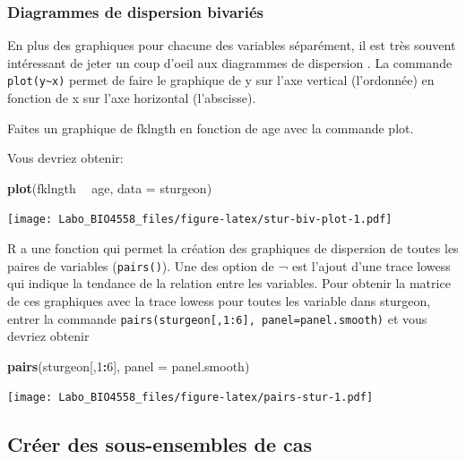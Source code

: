\documentclass[12pt,]{book}
\makeatletter
\newenvironment{Shaded}{\begin{snugshade}}{\end{snugshade}}
\newcommand{\DataTypeTok}[1]{\textcolor[rgb]{0.13,0.29,0.53}{#1}}
\newcommand{\DecValTok}[1]{\textcolor[rgb]{0.00,0.00,0.81}{#1}}
\newcommand{\KeywordTok}[1]{\textcolor[rgb]{0.13,0.29,0.53}{\textbf{#1}}}
\newcommand{\NormalTok}[1]{#1}
\newcommand{\OperatorTok}[1]{\textcolor[rgb]{0.81,0.36,0.00}{\textbf{#1}}}
\newcommand{\StringTok}[1]{\textcolor[rgb]{0.31,0.60,0.02}{#1}}
\newenvironment{kframe}{%
\medskip{}
\setlength{\fboxsep}{.8em}
\def\at@end@of@kframe{}%
\ifinner\ifhmode%
 \def\at@end@of@kframe{\end{minipage}}%
 \begin{minipage}{\columnwidth}%
\fi\fi%
\def\FrameCommand##1{\hskip\@totalleftmargin \hskip-\fboxsep
\colorbox{incolor}{##1}\hskip-\fboxsep
    \hskip-\linewidth \hskip-\@totalleftmargin \hskip\columnwidth}%
\MakeFramed {\advance\hsize-\width
  \@totalleftmargin\z@ \linewidth\hsize
  \@setminipage}}%
{\par\unskip\endMakeFramed%
\at@end@of@kframe}
\newenvironment{rmdblock}[1]
 {
 \begin{itemize}
 \renewcommand{\labelitemi}{
   \raisebox{-.7\height}[0pt][0pt]{
     {\setkeys{Gin}{width=3em,keepaspectratio}\texttt{[image: images/\#1]}}
   }
 }
 \begin{kframe}
 \setlength{\fboxsep}{1em}
 \item
 }
 {
 \end{kframe}
 \end{itemize}
 }
\newenvironment{rmdcode}
  {\begin{rmdblock}{screen}}
  {\end{rmdblock}}
\makeatother
\begin{document}
\hypertarget{diagrammes-de-dispersion-bivariuxe9s}{%
\subsubsection{Diagrammes de dispersion bivariés}\label{diagrammes-de-dispersion-bivariuxe9s}}

En plus des graphiques pour chacune des variables séparément, il est très souvent intéressant de jeter un coup d'oeil aux diagrammes de dispersion .
La commande \texttt{plot(y\textasciitilde{}x)} permet de faire le graphique de y sur l'axe vertical (l'ordonnée) en fonction de x sur l'axe horizontal (l'abscisse).

\begin{rmdcode}
Faites un graphique de fklngth en fonction de age avec la commande plot.
\end{rmdcode}

Vous devriez obtenir:

\begin{Shaded}
\begin{Highlighting}[]
\KeywordTok{plot}\NormalTok{(fklngth }\OperatorTok{~}\StringTok{ }\NormalTok{age, }\DataTypeTok{data =}\NormalTok{ sturgeon)}
\end{Highlighting}
\end{Shaded}

\texttt{[image: Labo\_BIO4558\_files/figure-latex/stur-biv-plot-1.pdf]}

R a une fonction qui permet la création des graphiques de dispersion de toutes les paires de variables (\texttt{pairs()}).
Une des option de ¬ est l'ajout d'une trace lowess qui indique la tendance de la relation entre les variables.
Pour obtenir la matrice de ces graphiques avec la trace lowess pour toutes les variable dans sturgeon, entrer la commande \texttt{pairs(sturgeon{[},1:6{]},\ panel=panel.smooth)} et vous devriez obtenir

\begin{Shaded}
\begin{Highlighting}[]
\KeywordTok{pairs}\NormalTok{(sturgeon[,}\DecValTok{1}\OperatorTok{:}\DecValTok{6}\NormalTok{], }\DataTypeTok{panel =}\NormalTok{ panel.smooth)}
\end{Highlighting}
\end{Shaded}

\texttt{[image: Labo\_BIO4558\_files/figure-latex/pairs-stur-1.pdf]}

\hypertarget{cruxe9er-des-sous-ensembles-de-cas}{%
\subsection{Créer des sous-ensembles de cas}\label{cruxe9er-des-sous-ensembles-de-cas}}
\end{document}
